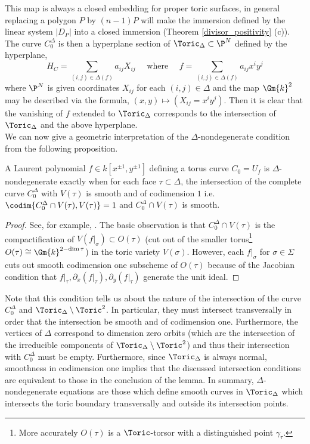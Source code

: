 This map is always a closed embedding for proper toric surfaces, in general replacing a polygon $P$ by $(n-1)P$ will make the immersion defined by the linear system $|D_P|$ into a closed immersion (Theorem \ref{divisor_positivity} (c)). The curve $C^\Delta_0$ is then a hyperplane section of $\Toric_\Delta \subset \P^N$ defined by the hyperplane,
\[ H_C = \sum_{(i, j) \in \Delta(f)} a_{ij} X_{ij} \quad \text{ where } \quad f = \sum_{(i,j) \in \Delta(f)} a_{ij} x^i y^j \]
where $\P^N$ is given coordinates $X_{ij}$ for each $(i,j) \in \Delta$ and the map $\Gm{k}^2$ may be described via the formula, $(x,y) \mapsto (X_{ij} = x^i y^j)$. Then it is clear that the vanishing of $f$ extended to $\Toric_\Delta$ corresponds to the intersection of $\Toric_\Delta$ and the above hyperplane.  
\bigskip\\
We can now give a geometric interpretation of the $\Delta$-nondegenerate condition from the following proposition.

\begin{prop} \label{lemma_nondegeneracy}
A Laurent polynomial $f \in k[x^{\pm 1}, y^{\pm 1}]$ defining a torus curve $C_0 = U_f$ is $\Delta$-nondegenerate exactly when for each face $\tau \subset \Delta$, the intersection of the complete curve $C^\Delta_0$ with $V(\tau)$ is smooth and of codimension $1$ i.e. $\codim{C^\Delta_0 \cap V(\tau), V(\tau)} = 1$ and $C^\Delta_0 \cap V(\tau)$ is smooth.
\end{prop}

\begin{proof}
See, for example, \cite[Prop. 4.6]{Batyrev}. The basic observation is that $C_0^\Delta \cap V(\tau)$ is the compactification of $V(f|_\sigma) \subset O(\tau)$ (cut out of the smaller torus\footnote{More accurately $O(\tau)$ is a $\Toric$-torsor with a distinguished point $\gamma_\tau$.} $O(\tau) \cong \Gm{k}^{2 - \dim{\tau}}$) in the toric variety $V(\sigma)$. However, each $f |_\sigma$ for $\sigma \in \Sigma$ cuts out smooth codimension one subscheme of $O(\tau)$ because of the Jacobian condition that $f|_\tau, \partial_x (f|_\tau), \partial_y (f|_\tau)$ generate the unit ideal.
\end{proof}
\noindent
Note that this condition tells us about the nature of the intersection of the curve $C^\Delta_0$ and $\Toric_\Delta \setminus \Toric^2$. In particular, they must intersect transversally in order that the intersection be smooth and of codimension one. Furthermore, the vertices of $\Delta$ correspond to dimension zero orbits (which are the intersection of the irreducible components of $\Toric_\Delta \setminus \Toric^2$) and thus their intersection with $C^\Delta_0$ must be empty. Furthermore, since $\Toric_\Delta$ is always normal, smoothness in codimension one implies that the discussed intersection conditions are equivalent to those in the conclusion of the lemma. In summary, $\Delta$-nondegenerate equations are those which define smooth curves in $\Toric_\Delta$ which intersects the toric boundary transversally and outside its intersection points.

